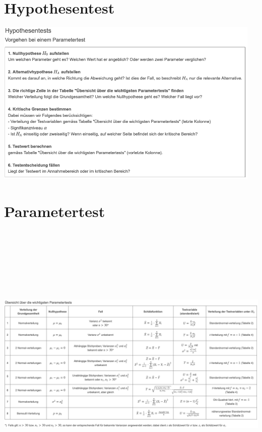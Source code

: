 \documentclass[8pt,a4paper]{scrartcl}
\begin{document}
\section{Hypothesentest}
\includegraphics[height=8cm]{img/Hypothesentest.png}
\section{Parametertest}
\includegraphics[height=14cm]{img/Parametertest.png} 


\pagebreak
\end{document}
